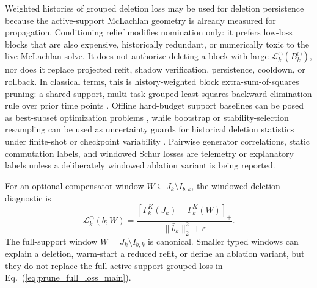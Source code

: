\documentclass[
  reprint,
  amsmath,
  amssymb,
  aps,
  pra,
  nofootinbib,
  superscriptaddress,
  floatfix
]{revtex4-2}
\newcommand{\eps}{\varepsilon}
\begin{document}
\endgroup
Weighted histories of grouped deletion loss may be used for deletion persistence because the active-support McLachlan geometry is already measured for propagation.  Conditioning relief modifies nomination only: it prefers low-loss blocks that are also expensive, historically redundant, or numerically toxic to the live McLachlan solve.  It does not authorize deleting a block with large \(\mathcal L_k^{\ominus}(B_k^{\ominus})\), nor does it replace projected refit, shadow verification, persistence, cooldown, or rollback.  In classical terms, this is history-weighted block extra-sum-of-squares pruning: a shared-support, multi-task grouped least-squares backward-elimination rule over prior time points \cite{YuanLin2006}.  Offline hard-budget support baselines can be posed as best-subset optimization problems \cite{BertsimasKingMazumder2016}, while bootstrap or stability-selection resampling can be used as uncertainty guards for historical deletion statistics under finite-shot or checkpoint variability \cite{Efron1979,MeinshausenBuhlmann2010}. Pairwise generator correlations, static commutation labels, and windowed Schur losses are telemetry or explanatory labels unless a deliberately windowed ablation variant is being reported.

For an optional compensator window $W\subseteq J_k\setminus I_{b,k}$, the windowed deletion diagnostic is
\begin{equation}
\mathcal L_k^{\ominus}(b;W)
=
\frac{
\left[
\Gamma_k^K(J_k)-\Gamma_k^K(W)
\right]_+
}{\|\bar b_k\|_2^2+\eps}.
\label{eq:windowed_prune_loss_main}
\end{equation}
The full-support window $W=J_k\setminus I_{b,k}$ is canonical.  Smaller typed windows can explain a deletion, warm-start a reduced refit, or define an ablation variant, but they do not replace the full active-support grouped loss in Eq.~(\ref{eq:prune_full_loss_main}).
\end{document}
